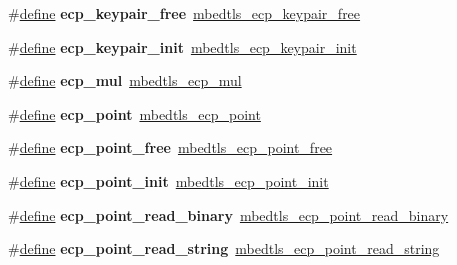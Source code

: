 \begin{DoxyCompactItemize}
\#\hyperlink{structdefine}{define} {\bfseries ecp\+\_\+keypair\+\_\+free}~\hyperlink{ecp_8h_a04ea689d8d97b423a5d646cd9c53f400}{mbedtls\+\_\+ecp\+\_\+keypair\+\_\+free}
\item 
\mbox{\label{compat-1_83_8h_a6a1129c5c001ab0b44339e76dba625a4}} 
\#\hyperlink{structdefine}{define} {\bfseries ecp\+\_\+keypair\+\_\+init}~\hyperlink{ecp_8h_a770d9e33e938f2033fd3f77e6fa2a697}{mbedtls\+\_\+ecp\+\_\+keypair\+\_\+init}
\item 
\mbox{\label{compat-1_83_8h_adb63bd2a6de68b8e65599318f6f9756a}} 
\#\hyperlink{structdefine}{define} {\bfseries ecp\+\_\+mul}~\hyperlink{ecp_8h_a4d005045c302e100c78bdc587e8f0e6a}{mbedtls\+\_\+ecp\+\_\+mul}
\item 
\mbox{\label{compat-1_83_8h_ab712d821840b9e5f31f045d939b62791}} 
\#\hyperlink{structdefine}{define} {\bfseries ecp\+\_\+point}~\hyperlink{structmbedtls__ecp__point}{mbedtls\+\_\+ecp\+\_\+point}
\item 
\mbox{\label{compat-1_83_8h_a9fc0e6255e9ea66d37e95a525f807d69}} 
\#\hyperlink{structdefine}{define} {\bfseries ecp\+\_\+point\+\_\+free}~\hyperlink{ecp_8h_a87004f74814cc59a9ef757aea444098d}{mbedtls\+\_\+ecp\+\_\+point\+\_\+free}
\item 
\mbox{\label{compat-1_83_8h_abbefc5337c6b7062bb11814e7e2f0a06}} 
\#\hyperlink{structdefine}{define} {\bfseries ecp\+\_\+point\+\_\+init}~\hyperlink{ecp_8h_ae069f80bc2f9cf2215c34430a9ccd924}{mbedtls\+\_\+ecp\+\_\+point\+\_\+init}
\item 
\mbox{\label{compat-1_83_8h_af6198afce085ab05667428f45ca579af}} 
\#\hyperlink{structdefine}{define} {\bfseries ecp\+\_\+point\+\_\+read\+\_\+binary}~\hyperlink{ecp_8h_a08eb064f95d4ebd2d7822234f7b64b4d}{mbedtls\+\_\+ecp\+\_\+point\+\_\+read\+\_\+binary}
\item 
\mbox{\label{compat-1_83_8h_a5a4860d3380f631d0001990aef8b1a27}} 
\#\hyperlink{structdefine}{define} {\bfseries ecp\+\_\+point\+\_\+read\+\_\+string}~\hyperlink{ecp_8h_a63bfda35c538b840a78371be788675dd}{mbedtls\+\_\+ecp\+\_\+point\+\_\+read\+\_\+string}
\item 
\mbox{\label{compat-1_83_8h_ae5aff48664421b5386b0e9f7ee1eddec}} 

\end{DoxyCompactItemize}
